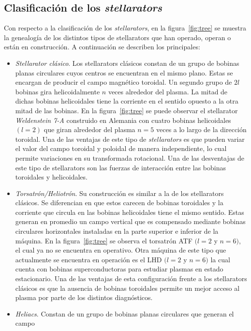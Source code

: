 \subsection{Clasificación de los \textit{stellarators}}
Con respecto a la clasificación de los \textit{stellarators}, en la figura~\ref{fig:tree} se muestra la genealogía
de los distintos tipos de stellarators que han operado, operan o están en construcción. A
continuación se describen los principales:
\begin{itemize}
    \item \textit{Stellarator clásico}. Los stellarators clásicos constan de un grupo de bobinas planas circulares
    cuyos centros se encuentran en el mismo plano. Estas se encargan de producir
    el campo magnético toroidal. Un segundo grupo de $2l$ bobinas gira helicoidalmente $n$
    veces alrededor del plasma. La mitad de dichas bobinas helicoidales tiene la corriente
    en el sentido opuesto a la otra mitad de las bobinas. En la figura~\ref{fig:tree} se puede observar
    el stellarator \textit{Weldenstein 7-A} construido en Alemania con cuatro bobinas helicoidales
    $(l=2)$ que giran alrededor del plasma $n=5$ veces a lo largo de la dirección toroidal.
    Una de las ventajas de este tipo de \textit{stellarators} es que pueden variar el valor del campo
    toroidal y poloidal de manera independiente, lo cual permite variaciones en su transformada
    rotacional.
    Una de las desventajas de este tipo de stellarators son las fuerzas de interacción entre
    las bobinas toroidales y helicoidales.
    \item \textit{Torsatrón/Heliotrón}. Su construcción es similar a la de los stellarators clásicos. Se
    diferencian en que estos carecen de bobinas toroidales y la corriente que circula en
    las bobinas helicoidales tiene el mismo sentido. Estas generan en promedio un campo
    vertical que es compensado mediante bobinas circulares horizontales instaladas en la
    parte superior e inferior de la máquina. En la figura~\ref{fig:tree} se observa el torsatrón ATF
   $(l=2$ y $n=6)$, el cual ya no se encuentra en operativo. Otra máquina de este tipo
    que actualmente se encuentra en operación es el LHD $(l=2$ y $n=6)$ la cual cuenta con
    bobinas superconductoras para estudiar plasmas en estado estacionario.
    Una de las ventajas de esta configuración frente a los stellarators clásicos es que la
    ausencia de bobinas toroidales permite un mejor acceso al plasma por parte de los
    distintos diagnósticos.
    \item \textit{Heliacs}. Constan de un grupo de bobinas planas circulares que generan el campo

\end{itemize}
